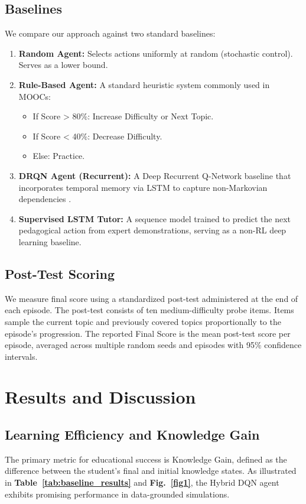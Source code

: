 \documentclass[conference]{IEEEtran}
\begin{document}
\subsection{Baselines}
We compare our approach against two standard baselines:
\begin{enumerate}
    \item \textbf{Random Agent:} Selects actions uniformly at random (stochastic control). Serves as a lower bound.
    \item \textbf{Rule-Based Agent:} A standard heuristic system commonly used in MOOCs:
    \begin{itemize}
        \item If Score > 80\%: Increase Difficulty or Next Topic.
        \item If Score < 40\%: Decrease Difficulty.
        \item Else: Practice.
    \end{itemize}
    \item \textbf{DRQN Agent (Recurrent):} A Deep Recurrent Q-Network baseline that incorporates temporal memory via LSTM to capture non-Markovian dependencies \cite{hausknecht2015}.
    \item \textbf{Supervised LSTM Tutor:} A sequence model trained to predict the next pedagogical action from expert demonstrations, serving as a non-RL deep learning baseline.
\end{enumerate}

\subsection{Post-Test Scoring}
We measure final score using a standardized post-test administered at the end of each episode. The post-test consists of ten medium-difficulty probe items. Items sample the current topic and previously covered topics proportionally to the episode’s progression. The reported Final Score is the mean post-test score per episode, averaged across multiple random seeds and episodes with 95\% confidence intervals.

\section{Results and Discussion}

\subsection{Learning Efficiency and Knowledge Gain}
The primary metric for educational success is Knowledge Gain, defined as the difference between the student's final and initial knowledge states. As illustrated in \textbf{Table~\ref{tab:baseline_results}} and \textbf{Fig.~\ref{fig1}}, the Hybrid DQN agent exhibits promising performance in data-grounded simulations.
\end{document}
